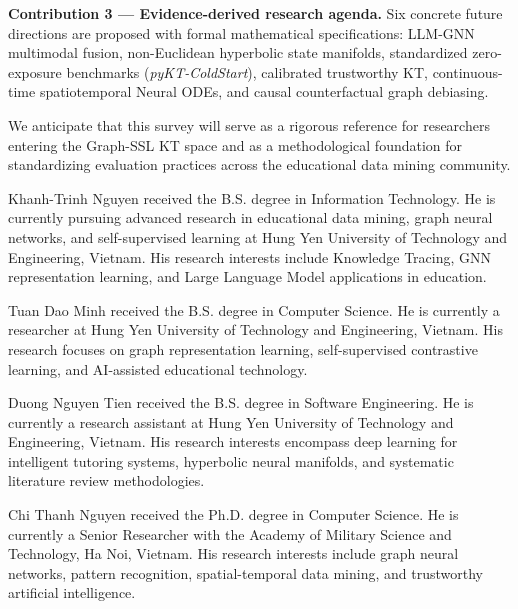 \documentclass[10pt,journal,compsoc]{IEEEtran}
\begin{document}
\textbf{Contribution 3 --- Evidence-derived research agenda.} Six concrete future directions are proposed with formal mathematical specifications: LLM-GNN multimodal fusion, non-Euclidean hyperbolic state manifolds, standardized zero-exposure benchmarks (\textit{pyKT-ColdStart}), calibrated trustworthy KT, continuous-time spatiotemporal Neural ODEs, and causal counterfactual graph debiasing.

We anticipate that this survey will serve as a rigorous reference for researchers entering the Graph-SSL KT space and as a methodological foundation for standardizing evaluation practices across the educational data mining community.




\begin{IEEEbiographynophoto}{Khanh-Trinh Nguyen}
received the B.S. degree in Information Technology. He is currently pursuing advanced research in educational data mining, graph neural networks, and self-supervised learning at Hung Yen University of Technology and Engineering, Vietnam. His research interests include Knowledge Tracing, GNN representation learning, and Large Language Model applications in education.
\end{IEEEbiographynophoto}

\begin{IEEEbiographynophoto}{Tuan Dao Minh}
received the B.S. degree in Computer Science. He is currently a researcher at Hung Yen University of Technology and Engineering, Vietnam. His research focuses on graph representation learning, self-supervised contrastive learning, and AI-assisted educational technology.
\end{IEEEbiographynophoto}

\begin{IEEEbiographynophoto}{Duong Nguyen Tien}
received the B.S. degree in Software Engineering. He is currently a research assistant at Hung Yen University of Technology and Engineering, Vietnam. His research interests encompass deep learning for intelligent tutoring systems, hyperbolic neural manifolds, and systematic literature review methodologies.
\end{IEEEbiographynophoto}

\begin{IEEEbiographynophoto}{Chi Thanh Nguyen}
received the Ph.D. degree in Computer Science. He is currently a Senior Researcher with the Academy of Military Science and Technology, Ha Noi, Vietnam. His research interests include graph neural networks, pattern recognition, spatial-temporal data mining, and trustworthy artificial intelligence.
\end{IEEEbiographynophoto}
\end{document}
